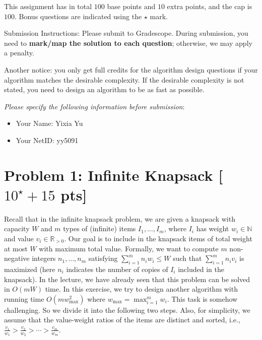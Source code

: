 \documentclass[letterpaper, 11pt]{article}
\newcommand{\1}{\mathds{1}}	%
\theoremstyle{definition}
\newcommand{\problem}[1]{\section*{Problem #1}}
\begin{document}
This assignment has in total $100$ base points and $10$ extra points, and the cap is $100$.
Bonus questions are indicated using the $\star$ mark.

Submission Instructions: Please submit to Gradescope. During submission, you need to \textbf{mark/map the solution to each question}; otherwise, we may apply a penalty. 

Another notice: you only get full credits for the algorithm design questions if your algorithm matches the desirable complexity. If the desirable complexity is not stated, you need to design an algorithm to be as fast as possible.

\textit{Please specify the following information before submission}:
\begin{itemize}
    \item Your Name: Yixia Yu%
    \item Your NetID: yy5091 %
\end{itemize}
\clearpage

\problem{1: Infinite Knapsack [$10^\star+15$ pts]}
Recall that in the infinite knapsack problem, we are given a knapsack with capacity $W$ and $m$ types of (infinite) items $I_1,\dots,I_m$, where $I_i$ has weight $w_i \in \mathbb{N}$ and value $v_i \in \mathbb{R}_{>0}$.
Our goal is to include in the knapsack items of total weight at most $W$ with maximum total value.
Formally, we want to compute $m$ non-negative integers $n_1,\dots,n_m$ satisfying $\sum_{i=1}^m n_i w_i \leq W$ such that $\sum_{i=1}^m n_i v_i$ is maximized (here $n_i$ indicates the number of copies of $I_i$ included in the knapsack).
In the lecture, we have already seen that this problem can be solved in $O(mW)$ time.
In this exercise, we try to design another algorithm with running time $O(mw_{\max}^2)$ where $w_{\max} = \max_{i=1}^m w_i$.
This task is somehow challenging.
So we divide it into the following two steps.
Also, for simplicity, we assume that the value-weight ratios of the items are distinct and sorted, i.e., $\frac{v_1}{w_1} > \frac{v_2}{w_2} > \cdots > \frac{v_m}{w_m}$.
\end{document}
